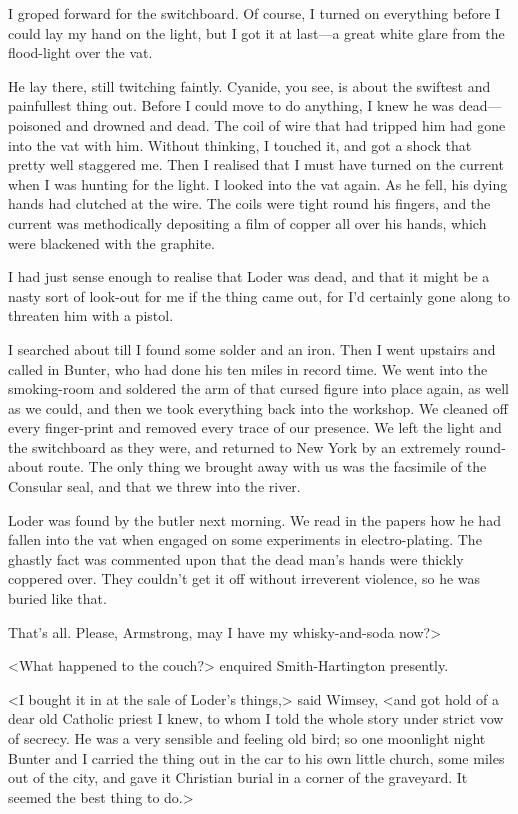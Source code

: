 I groped forward for the switchboard. Of course, I turned on everything before I could lay my hand on the light, but I got it at last—a great white glare from the flood-light over the vat.

He lay there, still twitching faintly. Cyanide, you see, is about the swiftest and painfullest thing out. Before I could move to do anything, I knew he was dead—poisoned and drowned and dead. The coil of wire that had tripped him had gone into the vat with him. Without thinking, I touched it, and got a shock that pretty well staggered me. Then I realised that I must have turned on the current when I was hunting for the light. I looked into the vat again. As he fell, his dying hands had clutched at the wire. The coils were tight round his fingers, and the current was methodically depositing a film of copper all over his hands, which were blackened with the graphite.

I had just sense enough to realise that Loder was dead, and that it might be a nasty sort of look-out for me if the thing came out, for I'd certainly gone along to threaten him with a pistol.

I searched about till I found some solder and an iron. Then I went upstairs and called in Bunter, who had done his ten miles in record time. We went into the smoking-room and soldered the arm of that cursed figure into place again, as well as we could, and then we took everything back into the workshop. We cleaned off every finger-print and removed every trace of our presence. We left the light and the switchboard as they were, and returned to New York by an extremely round-about route. The only thing we brought away with us was the facsimile of the Consular seal, and that we threw into the river.

Loder was found by the butler next morning. We read in the papers how he had fallen into the vat when engaged on some experiments in electro-plating. The ghastly fact was commented upon that the dead man's hands were thickly coppered over. They couldn't get it off without irreverent violence, so he was buried like that.

That's all. Please, Armstrong, may I have my whisky-and-soda now?>

<What happened to the couch?> enquired Smith-Hartington presently.

<I bought it in at the sale of Loder's things,> said Wimsey, <and got hold of a dear old Catholic priest I knew, to whom I told the whole story under strict vow of secrecy. He was a very sensible and feeling old bird; so one moonlight night Bunter and I carried the thing out in the car to his own little church, some miles out of the city, and gave it Christian burial in a corner of the graveyard. It seemed the best thing to do.>
